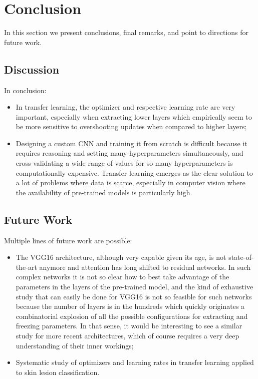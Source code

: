 \chapter{Conclusion}
\label{chapter:conclusion}

In this section we present conclusions, final remarks, and point to directions for future work.

\section{Discussion}

In conclusion:

\begin{itemize}
    \item In transfer learning, the optimizer and respective learning rate are very important, especially when extracting lower layers which empirically seem to be more sensitive to overshooting updates when compared to higher layers;
    \item Designing a custom \ac{CNN} and training it from scratch is difficult because it requires reasoning and setting many hyperparameters simultaneously, and cross-validating a wide range of values for so many hyperparameters is computationally expensive. Transfer learning emerges as the clear solution to a lot of problems where data is scarce, especially in computer vision where the availability of pre-trained models is particularly high.
\end{itemize}

\section{Future Work}

Multiple lines of future work are possible:

\begin{itemize}
    \item The VGG16 architecture, although very capable given its age, is not state-of-the-art anymore and attention has long shifted to residual networks. In such complex networks it is not so clear how to best take advantage of the parameters in the layers of the pre-trained model, and the kind of exhaustive study that can easily be done for VGG16 is not so feasible for such networks because the number of layers is in the hundreds which quickly originates a combinatorial explosion of all the possible configurations for extracting and freezing parameters. In that sense, it would be interesting to see a similar study for more recent architectures, which of course requires a very deep understanding of their inner workings;
    \item Systematic study of optimizers and learning rates in transfer learning applied to skin lesion classification.
\end{itemize}

